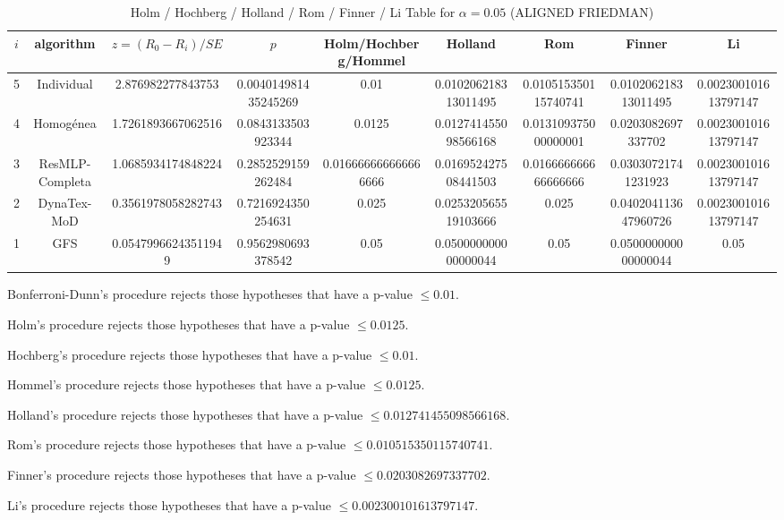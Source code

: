 \documentclass[a4paper,10pt]{article}
\begin{document}
\begin{landscape}
\begin{table}[!htp]
\centering\scriptsize
\caption{Holm / Hochberg / Holland / Rom / Finner / Li Table for $\alpha=0.05$ (ALIGNED FRIEDMAN)}
\begin{tabular}{ccccccccc}
$i$&algorithm&$z=(R_0 - R_i)/SE$&$p$&Holm/Hochberg/Hommel&Holland&Rom&Finner&Li\\
\hline
5&Individual&2.876982277843753&0.004014981435245269&0.01&0.010206218313011495&0.010515350115740741&0.010206218313011495&0.002300101613797147\\
4&Homogénea&1.7261893667062516&0.0843133503923344&0.0125&0.012741455098566168&0.013109375000000001&0.0203082697337702&0.002300101613797147\\
3&ResMLP-Completa&1.0685934174848224&0.2852529159262484&0.016666666666666666&0.016952427508441503&0.016666666666666666&0.03030721741231923&0.002300101613797147\\
2&DynaTex-MoD&0.3561978058282743&0.7216924350254631&0.025&0.025320565519103666&0.025&0.040204113647960726&0.002300101613797147\\
1&GFS&0.05479966243511949&0.9562980693378542&0.05&0.050000000000000044&0.05&0.050000000000000044&0.05\\
\hline
\end{tabular}
\end{table}
Bonferroni-Dunn's procedure rejects those hypotheses that have a p-value $\le0.01$.


Holm's procedure rejects those hypotheses that have a p-value $\le0.0125$.


Hochberg's procedure rejects those hypotheses that have a p-value $\le0.01$.


Hommel's procedure rejects those hypotheses that have a p-value $\le0.0125$.


Holland's procedure rejects those hypotheses that have a p-value $\le0.012741455098566168$.


Rom's procedure rejects those hypotheses that have a p-value $\le0.010515350115740741$.


Finner's procedure rejects those hypotheses that have a p-value $\le0.0203082697337702$.


Li's procedure rejects those hypotheses that have a p-value $\le0.002300101613797147$.



\newpage


\end{landscape}
\end{document}
